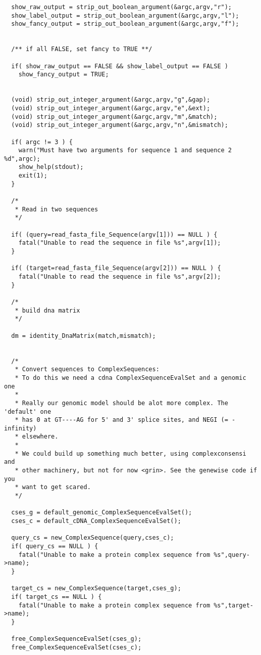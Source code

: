 \begin{verbatim}
  show_raw_output = strip_out_boolean_argument(&argc,argv,"r");
  show_label_output = strip_out_boolean_argument(&argc,argv,"l");
  show_fancy_output = strip_out_boolean_argument(&argc,argv,"f");


  /** if all FALSE, set fancy to TRUE **/

  if( show_raw_output == FALSE && show_label_output == FALSE ) 
    show_fancy_output = TRUE;


  (void) strip_out_integer_argument(&argc,argv,"g",&gap);
  (void) strip_out_integer_argument(&argc,argv,"e",&ext);
  (void) strip_out_integer_argument(&argc,argv,"m",&match);
  (void) strip_out_integer_argument(&argc,argv,"n",&mismatch);

  if( argc != 3 ) {
    warn("Must have two arguments for sequence 1 and sequence 2 %d",argc);
    show_help(stdout);
    exit(1);
  }
  
  /*
   * Read in two sequences
   */
  
  if( (query=read_fasta_file_Sequence(argv[1])) == NULL ) {
    fatal("Unable to read the sequence in file %s",argv[1]);
  }
  
  if( (target=read_fasta_file_Sequence(argv[2])) == NULL ) {
    fatal("Unable to read the sequence in file %s",argv[2]);
  }

  /*
   * build dna matrix 
   */

  dm = identity_DnaMatrix(match,mismatch);
  
  
  /*
   * Convert sequences to ComplexSequences: 
   * To do this we need a cdna ComplexSequenceEvalSet and a genomic one
   *
   * Really our genomic model should be alot more complex. The 'default' one
   * has 0 at GT----AG for 5' and 3' splice sites, and NEGI (= -infinity)
   * elsewhere. 
   *
   * We could build up something much better, using complexconsensi and 
   * other machinery, but not for now <grin>. See the genewise code if you
   * want to get scared.
   */
  
  cses_g = default_genomic_ComplexSequenceEvalSet();
  cses_c = default_cDNA_ComplexSequenceEvalSet();
  
  query_cs = new_ComplexSequence(query,cses_c);
  if( query_cs == NULL ) {
    fatal("Unable to make a protein complex sequence from %s",query->name);
  }
  
  target_cs = new_ComplexSequence(target,cses_g);
  if( target_cs == NULL ) {
    fatal("Unable to make a protein complex sequence from %s",target->name);
  }

  free_ComplexSequenceEvalSet(cses_g);
  free_ComplexSequenceEvalSet(cses_c);
  

\end{verbatim}

